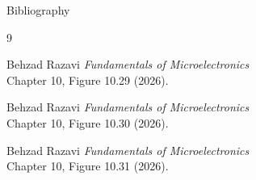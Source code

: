 \documentclass[10pt]{beamer}
\begin{document}
\begin{frame}[allowframebreaks]{Bibliography}
\begin{thebibliography}{9}
        \vspace{0.1 cm}

         Behzad Razavi \textit{Fundamentals of Microelectronics}
        \\ {\scriptsize Chapter 10, Figure 10.29 (2026).}

        \vspace{0.1 cm}

         Behzad Razavi \textit{Fundamentals of Microelectronics}
        \\ {\scriptsize Chapter 10, Figure 10.30 (2026).}

        \vspace{0.1 cm}

         Behzad Razavi \textit{Fundamentals of Microelectronics}
        \\ {\scriptsize Chapter 10, Figure 10.31 (2026).}
    \end{thebibliography}
\end{frame}
\end{document}
